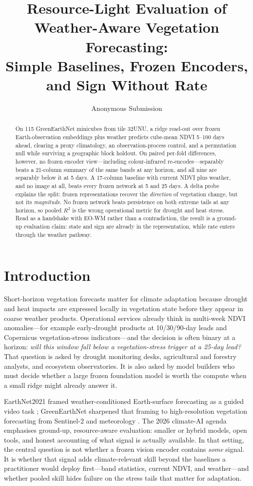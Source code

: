 \documentclass[10pt,twocolumn]{article}
\title{Resource-Light Evaluation of Weather-Aware Vegetation Forecasting:\\
Simple Baselines, Frozen Encoders, and Sign Without Rate}
\author{Anonymous Submission}
\date{}
\begin{document}
\maketitle

\begin{abstract}
On 115 GreenEarthNet minicubes from tile 32UNU, a ridge read-out over frozen
Earth-observation embeddings plus weather predicts cube-mean NDVI 5--100 days
ahead, clearing a proxy climatology, an observation-process control, and a
permutation null while surviving a geographic block holdout. On paired
per-fold differences, however, no frozen encoder view---including
colour-infrared re-encodes---separably beats a 21-column summary of the same
bands at any horizon, and all nine are separably below it at 5 days. A
17-column baseline with current NDVI plus weather, and no image at all, beats
every frozen network at 5 and 25 days. A delta probe explains the split:
frozen representations recover the \emph{direction} of vegetation change, but
not its \emph{magnitude}. No frozen network beats persistence on both extreme
tails at any horizon, so pooled $R^2$ is the wrong operational metric for
drought and heat stress. Read as a handshake with EO-WM rather than a
contradiction, the result is a ground-up evaluation claim: state and sign are
already in the representation, while rate enters through the weather pathway.
\end{abstract}

\section{Introduction}
Short-horizon vegetation forecasts matter for climate adaptation because drought
and heat impacts are expressed locally in vegetation state before they appear
in coarse weather products. Operational services already think in multi-week
NDVI anomalies---for example early-drought products at 10/30/90-day leads and
Copernicus vegetation-stress indicators---and the decision is often binary at a
horizon: \emph{will this window fall below a vegetation-stress trigger at a
25-day lead?} That question is asked by drought monitoring desks, agricultural
and forestry analysts, and ecosystem observatories. It is also asked by model
builders who must decide whether a large frozen foundation model is worth the
compute when a small ridge might already answer it.

EarthNet2021 framed weather-conditioned Earth-surface forecasting as a guided
video task \citep{requena2021earthnet2021}; GreenEarthNet sharpened that framing
to high-resolution vegetation forecasting from Sentinel-2 and meteorology
\citep{benson2024greenearthnet}. The 2026 climate-AI agenda emphasises
ground-up, resource-aware evaluation: smaller or hybrid models, open tools, and
honest accounting of what signal is actually available. In that setting, the
central question is not whether a frozen vision encoder contains \emph{some}
signal. It is whether that signal adds climate-relevant skill beyond the
baselines a practitioner would deploy first---band statistics, current NDVI,
and weather---and whether pooled skill hides failure on the stress tails that
matter for adaptation.
\end{document}
